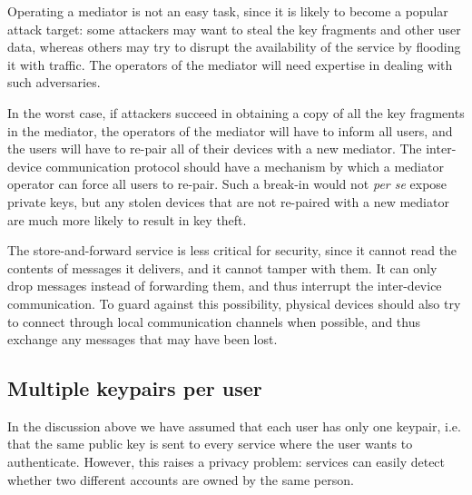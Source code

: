 Operating a mediator is not an easy task, since it is likely to become a popular attack target: some
attackers may want to steal the key fragments and other user data, whereas others may try to disrupt
the availability of the service by flooding it with traffic. The operators of the mediator will need
expertise in dealing with such adversaries.

In the worst case, if attackers succeed in obtaining a copy of all the key fragments in the
mediator, the operators of the mediator will have to inform all users, and the users will have to
re-pair all of their devices with a new mediator. The inter-device communication protocol should
have a mechanism by which a mediator operator can force all users to re-pair. Such a break-in would
not \emph{per se} expose private keys, but any stolen devices that are not re-paired with a new
mediator are much more likely to result in key theft.

The store-and-forward service is less critical for security, since it cannot read the contents of
messages it delivers, and it cannot tamper with them. It can only drop messages instead of
forwarding them, and thus interrupt the inter-device communication. To guard against this
possibility, physical devices should also try to connect through local communication channels when
possible, and thus exchange any messages that may have been lost.

\subsection{Multiple keypairs per user}\label{sec:identities}

In the discussion above we have assumed that each user has only one keypair, i.e. that the same
public key is sent to every service where the user wants to authenticate. However, this raises a
privacy problem: services can easily detect whether two different accounts are owned by the same
person.

